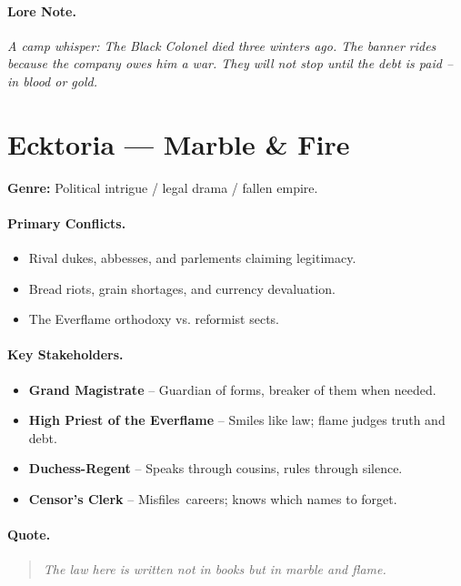 \paragraph{Lore Note.}
\emph{A camp whisper: \textquotedbl The Black Colonel died three winters ago. The banner rides because the company owes him a war. They will not stop until the debt is paid -- in blood or gold.\textquotedbl}

\section{Ecktoria --- \textquotedbl Marble \& Fire\textquotedbl}
\textbf{Genre:} Political intrigue / legal drama / fallen empire.

\paragraph{Primary Conflicts.}
\begin{itemize}
  \item Rival dukes, abbesses, and parlements claiming legitimacy.
  \item Bread riots, grain shortages, and currency devaluation.
  \item The Everflame orthodoxy vs. reformist sects.
\end{itemize}

\paragraph{Key Stakeholders.}
\begin{itemize}
  \item \textbf{Grand Magistrate} -- Guardian of forms, breaker of them when needed.
  \item \textbf{High Priest of the Everflame} -- Smiles like law; flame judges truth and debt.
  \item \textbf{Duchess-Regent} -- Speaks through cousins, rules through silence.
  \item \textbf{Censor's Clerk} -- \textquotedbl Misfiles\textquotedbl\ careers; knows which names to forget.
\end{itemize}

\paragraph{Quote.}
\begin{quote}
\emph{\textquotedbl The law here is written not in books but in marble and flame.\textquotedbl}
\end{quote}

